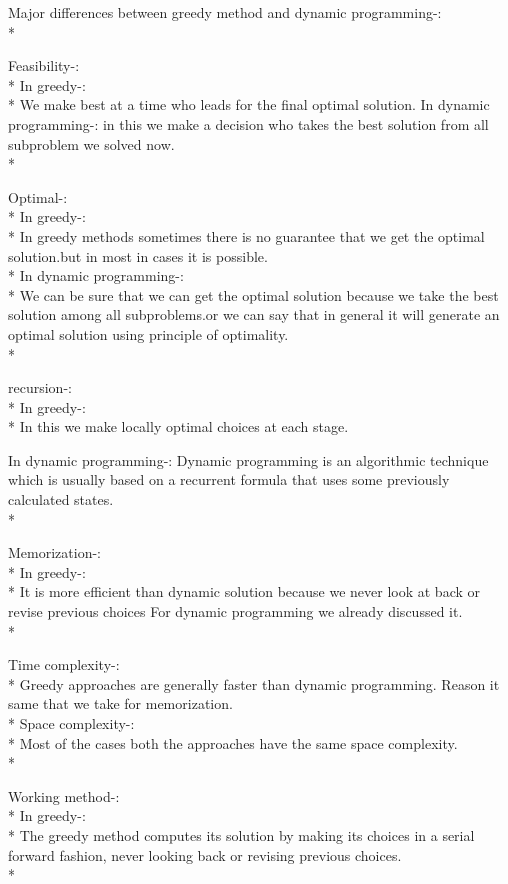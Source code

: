 \documentclass[12pt]{book}
\begin{document}
Major differences between greedy method and dynamic programming-: \\*

Feasibility-:  \\*
In greedy-: \\*
                    We make best at a time who leads for the final optimal solution.
In dynamic programming-: in this we make a decision who takes the best solution from all subproblem we solved now.\\*

Optimal-:\\*
In greedy-:\\*
In greedy methods sometimes there is no guarantee that we get the optimal solution.but in most in cases it is possible.\\*
In dynamic programming-:\\*
We can be sure that we can get the optimal solution because we take the best solution among all subproblems.or we can say that in general it will generate an optimal solution using principle of optimality.\\*

recursion-:\\*
In greedy-:\\*
                   In this we make locally optimal choices at each stage.

In dynamic programming-: Dynamic programming is an algorithmic technique which is usually based on a recurrent formula that uses some previously calculated states.\\*

Memorization-: \\*
In greedy-: \\*
It is more efficient than dynamic solution because we never  look at back or revise previous choices
For dynamic programming we already discussed it. \\*

Time complexity-: \\*
Greedy approaches are generally faster than dynamic programming. Reason it same that we take for memorization.\\*
Space complexity-: \\*
Most of the cases both the approaches have the same space complexity.\\*

Working method-:\\*
In greedy-: \\*
          The greedy method computes its solution by making its choices in a serial forward fashion, never looking back or revising previous choices.\\*
\end{document}
